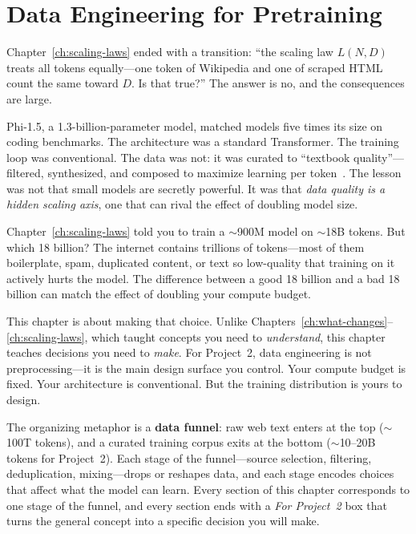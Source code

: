 \chapter{Data Engineering for Pretraining}
\label{ch:data-engineering}
\raggedbottom

Chapter~\ref{ch:scaling-laws} ended with a transition: ``the scaling law $L(N, D)$ treats all tokens equally---one token of Wikipedia and one of scraped HTML count the same toward $D$. Is that true?'' The answer is no, and the consequences are large.

Phi-1.5, a 1.3-billion-parameter model, matched models five times its size on coding benchmarks. The architecture was a standard Transformer. The training loop was conventional. The data was not: it was curated to ``textbook quality''---filtered, synthesized, and composed to maximize learning per token~\cite{gunasekar2023phi}. The lesson was not that small models are secretly powerful. It was that \emph{data quality is a hidden scaling axis}, one that can rival the effect of doubling model size.

Chapter~\ref{ch:scaling-laws} told you to train a $\sim$900M model on $\sim$18B tokens. But which 18 billion? The internet contains trillions of tokens---most of them boilerplate, spam, duplicated content, or text so low-quality that training on it actively hurts the model. The difference between a good 18 billion and a bad 18 billion can match the effect of doubling your compute budget.

This chapter is about making that choice. Unlike Chapters~\ref{ch:what-changes}--\ref{ch:scaling-laws}, which taught concepts you need to \emph{understand}, this chapter teaches decisions you need to \emph{make}. For Project~2, data engineering is not preprocessing---it is the main design surface you control. Your compute budget is fixed. Your architecture is conventional. But the training distribution is yours to design.

The organizing metaphor is a \textbf{data funnel}: raw web text enters at the top ($\sim$100T tokens), and a curated training corpus exits at the bottom ($\sim$10--20B tokens for Project~2). Each stage of the funnel---source selection, filtering, deduplication, mixing---drops or reshapes data, and each stage encodes choices that affect what the model can learn. Every section of this chapter corresponds to one stage of the funnel, and every section ends with a \emph{For Project~2} box that turns the general concept into a specific decision you will make.

